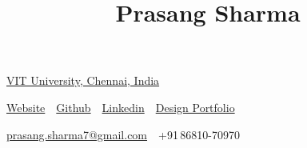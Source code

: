 \documentclass[letterpaper,10pt,oneside]{article}
\newcommand{\CVAuthor}{Prasang Sharma}
\newcommand{\CVWebpage}{https://prasang7.github.io/}
\begin{document}

\title{\CVAuthor}

\begin{subtitle}

\href{http://vit.ac.in/}
{VIT University, Chennai, India}

\par
\href{\CVWebpage}{Website}
\,\SubBulletSymbol
\,\href{https://github.com/prasang7}{Github}
\,\SubBulletSymbol
\,\href{https://in.linkedin.com/in/prasang7}{Linkedin}
\,\SubBulletSymbol
\,\href{https://www.behance.net/prasang7}{Design Portfolio}

\par
\href{mailto:prasang.sharma7@gmail.com}
{prasang.sharma7@gmail.com}
\,\SubBulletSymbol\,
+91\,86810-70970

\end{subtitle}
\end{document}

